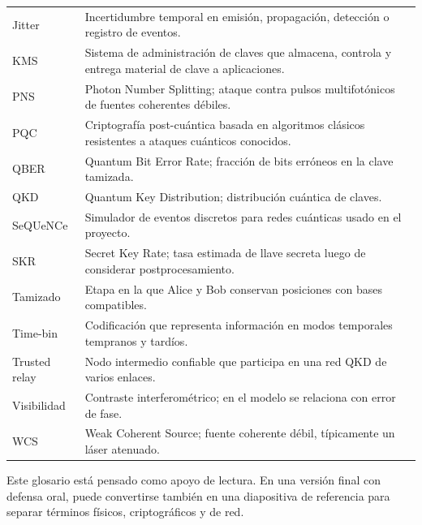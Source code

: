 \begin{longtable}{p{}p{}}
  Jitter & Incertidumbre temporal en emisión, propagación, detección o registro de eventos. \\
  KMS & Sistema de administración de claves que almacena, controla y entrega material de clave a aplicaciones. \\
  PNS & Photon Number Splitting; ataque contra pulsos multifotónicos de fuentes coherentes débiles. \\
  PQC & Criptografía post-cuántica basada en algoritmos clásicos resistentes a ataques cuánticos conocidos. \\
  QBER & Quantum Bit Error Rate; fracción de bits erróneos en la clave tamizada. \\
  QKD & Quantum Key Distribution; distribución cuántica de claves. \\
  SeQUeNCe & Simulador de eventos discretos para redes cuánticas usado en el proyecto. \\
  SKR & Secret Key Rate; tasa estimada de llave secreta luego de considerar postprocesamiento. \\
  Tamizado & Etapa en la que Alice y Bob conservan posiciones con bases compatibles. \\
  Time-bin & Codificación que representa información en modos temporales tempranos y tardíos. \\
  Trusted relay & Nodo intermedio confiable que participa en una red QKD de varios enlaces. \\
  Visibilidad & Contraste interferométrico; en el modelo se relaciona con error de fase. \\
  WCS & Weak Coherent Source; fuente coherente débil, típicamente un láser atenuado. \\
  \bottomrule
\end{longtable}

Este glosario está pensado como apoyo de lectura. En una versión final con defensa oral, puede convertirse también en una diapositiva de referencia para separar términos físicos, criptográficos y de red.

